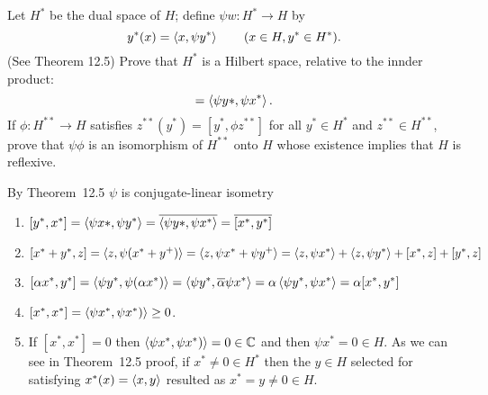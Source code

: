 \begin{enumerate}
\begin{excopy}
Let \(H^*\) be the dual space of $H$; define \(\psi w: H^* \to H\) by
\begin{equation*}
  y^*(x) = \left\langle x,\psi y^* \right\rangle \qquad (x\in H, y^*\in H^*).
\end{equation*}
(See Theorem 12.5) Prove that \(H^*\) is a Hilbert space,
relative to the innder product:
\begin{equation*}
 [x^*,y^*] = \lrangle{\psi y*,\psi x^*}.
\end{equation*}
If \(\phi: H^{**}\to H\) satisfies \(z^{**}(y^*) = [y^*, \phi z^{**}]\)
for all \(y^*\in H^*\) and \(z^{**} \in H^{**}\),
prove that \(\psi\phi\) is an isomorphism of \(H^{**}\) onto $H$
whose existence implies that $H$ is reflexive.
\end{excopy}
By Theorem~12.5 \(\psi\) is conjugate-linear isometry
\begin{enumerate}
\item
  \(
   [y^*,x^*]
   = \left\langle \psi x*,\psi y^* \right\rangle
   = \overline{\left\langle \psi y*,\psi x^* \right\rangle}
   = \overline{[x^*, y^*]}
  \)

\item 
  \(
  [x^* + y^*, z]
  = \left\langle z, \psi(x^* + y^+) \right\rangle
  = \left\langle z, \psi x^* + \psi y^+ \right\rangle
  = \left\langle z, \psi x^* \right\rangle + \left\langle z, \psi y^* \right\rangle
  + [x^*, z] + [y^*, z]
  \)

\item
   \(
  [\alpha x^*, y^*]
  = \left\langle \psi y^*, \psi (\alpha x^*) \right\rangle
  = \left\langle \psi y^*, \overline{\alpha}\psi x^* \right\rangle
  = \alpha\left\langle \psi y^*, \psi x^* \right\rangle 
  = \alpha[x^*, y^*]
  \)

\item
  \([x^*, x^*] = \left\langle \psi x^*, \psi x^*) \right\rangle \geq  0\).

\item
  If \([x^*, x^*]=0\) then
  \(\left\langle \psi x^*, \psi x^*) \right\rangle = 0 \in \mathbb{C}\)
  and then \(\psi x^* = 0 \in H\).
  As we can see in Theorem~12.5 proof, if \(x^* \neq 0 \in H^*\)
  then the \(y\in H\) selected for satisfying \(x^*(x) = \left\langle x, y \right\rangle\)
  resulted as \(x^* = y\neq 0\in H\).

\end{enumerate}


\end{enumerate}
